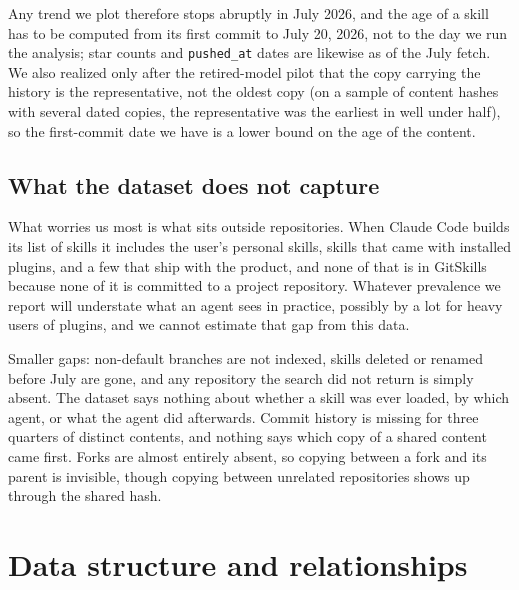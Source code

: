 \documentclass[11pt]{article}
\begin{document}
Any trend we plot therefore stops abruptly in July 2026, and the age of a skill has to be computed from its first commit to
July 20, 2026, not to the day we run the analysis; star counts and \texttt{pushed\_at} dates are likewise as of the July
fetch. We also realized only after the retired-model pilot that the copy carrying the history is the representative, not the
oldest copy (on a sample of content hashes with several dated copies, the representative was the earliest in well under
half), so the first-commit date we have is a lower bound on the age of the content.

\subsection{What the dataset does not capture}
What worries us most is what sits outside repositories. When Claude Code builds its list of skills it includes the user's
personal skills, skills that came with installed plugins, and a few that ship with the product, and none of that is in
GitSkills because none of it is committed to a project repository. Whatever prevalence we report will understate what an
agent sees in practice, possibly by a lot for heavy users of plugins, and we cannot estimate that gap from this data.

Smaller gaps: non-default branches are not indexed, skills deleted or renamed before July are gone, and any repository the
search did not return is simply absent. The dataset says nothing about whether a skill was ever loaded, by which agent, or
what the agent did afterwards. Commit history is missing for three quarters of distinct contents, and nothing says which
copy of a shared content came first. Forks are almost entirely absent, so copying between a fork and its parent is
invisible, though copying between unrelated repositories shows up through the shared hash.

\section{Data structure and relationships}
\end{document}
